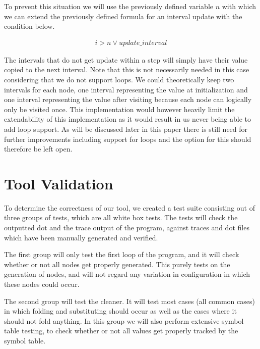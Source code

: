 \documentclass[12pt]{article}
\begin{document}
To prevent this situation we will use the previously defined variable $n$ with which we can extend the previously defined formula for an interval update with the condition below.

\begin{gather*}
	i > n \lor update\_interval
\end{gather*}

The intervals that do not get update within a step will simply have their value copied to the next interval. Note that this is not necessarily needed in this case considering that we do not support loops. We could theoretically keep two intervals for each node, one interval representing the value at initialization and one interval representing the value after visiting because each node can logically only be visited once. This implementation would however heavily limit the extendability of this implementation as it would result in us never being able to add loop support. As will be discussed later in this paper there is still need for further improvements including support for loops and the option for this should therefore be left open.

\section{Tool Validation}
To determine the correctness of our tool, we created a test suite consisting out of three groups of tests, which are all white box tests. The tests will check the outputted dot and the trace output of the program, against traces and dot files which have been manually generated and verified.

The first group will only test the first loop of the program, and it will check whether or not all nodes get properly generated. This purely tests on the generation of nodes, and will not regard any variation in configuration in which these nodes could occur.

The second group will test the cleaner. It will test most cases (all common cases) in which folding and substituting should occur as well as the cases where it should not fold anything. In this group we will also perform extensive symbol table testing, to check whether or not all values get properly tracked by the symbol table.
\end{document}
